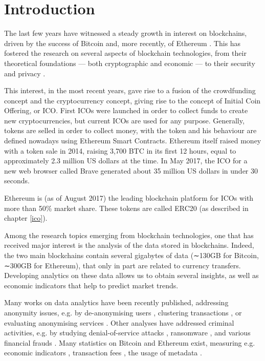 \label{Chapter1}

\chapter{Introduction}
The last few years have witnessed a steady growth in interest on blockchains, driven by the success of Bitcoin and, more recently, of Ethereum \cite{wood2014ethereum}. This has fostered the research on several aspects of blockchain technologies, from their theoretical foundations — both cryptographic \cite{clark2015research, garay2015bitcoin} and economic \cite{luu2015power, schrijvers2016incentive} — to their
security and privacy \cite{androulaki2013evaluating, bonneau2014mixcoin, gervais2016security, karame2015misbehavior, meiklejohn2013fistful}.

This interest, in the most recent years, gave rise to a fusion of the crowdfunding concept and the cryptocurrency concept, giving rise to the concept of Initial Coin Offering, or ICO. 
First ICOs were launched in order to collect funds to create new cryptocurrencies, but current ICOs are used for any purpose.
Generally, tokens are selled in order to collect money, with the token and his behaviour are defined nowadays using Ethereum Smart Contracts. Ethereum itself raised money with a token sale in 2014, raising 3,700 BTC in its first 12 hours, equal to approximately 2.3 million US dollars at the time. In May 2017, the ICO for a new web browser called Brave generated about 35 million US dollars in under 30 seconds.

Ethereum is (as of August 2017) the leading blockchain platform for ICOs with more than 50\% market share. These tokens are called ERC20 (as described in chapter \ref{ico}).

Among the research topics emerging from blockchain technologies, one that has received major interest is the analysis of the data stored in blockchains. Indeed, the two main blockchains contain several gigabytes of data (∼130GB for Bitcoin, ∼300GB for Ethereum), that only in part are related to currency transfers. Developing analytics on these data allows us to obtain several insights, as well as economic indicators that help to predict market trends.

Many works on data analytics have been recently published, addressing anonymity issues, e.g. by de-anonymising users \cite{meiklejohn2013fistful,ober2013structure,reid2013analysis}, clustering transactions \cite{vasek2015there,harrigan2016unreasonable}, or evaluating anonymising services \cite{moser2017anonymous}. Other analyses have addressed criminal activities, e.g. by studying denial-of-service attacks \cite{baqer2016stressing,vasek2014empirical}, ransomware \cite{liao2016behind}, and various financial frauds \cite{moser2013inquiry}. Many statistics on Bitcoin and Ethereum exist, measuring e.g. economic indicators \cite{lischke2016analyzing}, transaction fees \cite{moser2015trends}, the usage of metadata \cite{bartoletti2017analysis}.

